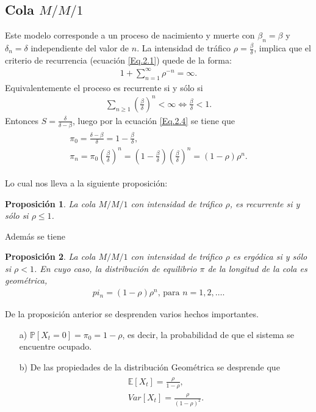 \documentclass{article}
\newtheorem{Prop}{Proposición}[section]
\newcommand{\esp}{\mathbb{E}}
\newcommand{\prob}{\mathbb{P}}
\numberwithin{equation}{section}
\begin{document}
\subsection*{Cola $M/M/1$}
Este modelo corresponde a un proceso de nacimiento y muerte con $\beta_{n}=\beta$ y $\delta_{n}=\delta$ independiente del valor de $n$. La intensidad de tr\'afico $\rho=\frac{\beta}{\delta}$, implica que el criterio de recurrencia (ecuaci\'on \ref{Eq.2.1}) quede de la forma:
\begin{eqnarray}
1+\sum_{n=1}^{\infty}\rho^{-n}=\infty.
\end{eqnarray}
Equivalentemente el proceso es recurrente si y s\'olo si
\begin{eqnarray}
\sum_{n\geq1}\left(\frac{\beta}{\delta}\right)^{n}<\infty\Leftrightarrow \frac{\beta}{\delta}<1.
\end{eqnarray}
Entonces
$S=\frac{\delta}{\delta-\beta}$, luego por la ecuaci\'on \ref{Eq.2.4} se tiene que
\begin{eqnarray}
\begin{array}{ll}
\pi_{0}=\frac{\delta-\beta}{\delta}=1-\frac{\beta}{\delta},\\
\pi_{n}=\pi_{0}\left(\frac{\beta}{\delta}\right)^{n}=\left(1-\frac{\beta}{\delta}\right)\left(\frac{\beta}{\delta}\right)^{n}=\left(1-\rho\right)\rho^{n}.
\end{array}
\end{eqnarray}

 
Lo cual nos lleva a la siguiente proposici\'on:

\begin{Prop}
La cola $M/M/1$ con intensidad de tr\'afico $\rho$, es recurrente si y s\'olo si $\rho\leq1$.
\end{Prop}

Adem\'as se tiene

\begin{Prop}
La cola $M/M/1$ con intensidad de tr\'afico $\rho$ es erg\'odica si y s\'olo si $\rho<1$. En cuyo caso, la distribuci\'on de equilibrio $\pi$ de la longitud de la cola es geom\'etrica, 
\begin{eqnarray}
pi_{n}=\left(1-\rho\right)\rho^{n}\textrm{, para }n=1,2,\ldots.
\end{eqnarray}
\end{Prop}

De la proposici\'on anterior se desprenden varios hechos importantes.
\begin{itemize}
\item[a) ] $\prob\left[X_{t}=0\right]=\pi_{0}=1-\rho$, es decir, la probabilidad de que el sistema se encuentre ocupado.
\item[b) ] De las propiedades de la distribuci\'on Geom\'etrica se desprende que
\begin{eqnarray}
\begin{array}{l}
\esp\left[X_{t}\right]=\frac{\rho}{1-\rho},\\
Var\left[X_{t}\right]=\frac{\rho}{\left(1-\rho\right)^{2}}.
\end{array}
\end{eqnarray}
\end{itemize}
\end{document}
